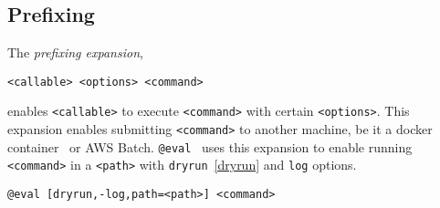 \subsection{Prefixing}
\label{prefixing}

The \emph{prefixing expansion},
%
\begin{verbatim}
<callable> <options> <command>
\end{verbatim}
%
enables \texttt{<callable>} to execute \texttt{<command>} with certain \texttt{<options>}. This expansion enables submitting \texttt{<command>} to another machine, be it a docker container~ or AWS Batch. \texttt{@eval}~ uses this expansion to enable running \texttt{<command>} in a \texttt{<path>} with \texttt{dryrun}~\ref{dryrun} and \texttt{log} options.
%
\begin{verbatim}
@eval [dryrun,-log,path=<path>] <command>
\end{verbatim}